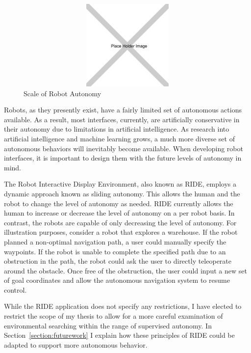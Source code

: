 \begin{figure}[ht]
\begin{center}
\includegraphics[width=5in,height=1.75in]{images/placeholder.png}
\caption{Scale of Robot Autonomy\label{fig:autonomy}}
\end{center}
\end{figure}

Robots, as they presently exist, have a fairly limited set of autonomous actions available. As a result, most interfaces, currently, are artificially conservative in their autonomy due to limitations in artificial intelligence. As research into artificial intelligence and machine learning grows, a much more diverse set of autonomous behaviors will inevitably become available. When developing robot interfaces, it is important to design them with the future levels of autonomy in mind. 

The Robot Interactive Display Environment, also known as RIDE, employs a dynamic approach known as sliding autonomy. This allows the human and the robot to change the level of autonomy as needed. RIDE currently allows the human to increase or decrease the level of autonomy on a per robot basis. In contrast, the robots are capable of only decreasing the level of autonomy. For illustration purposes, consider a robot that explores a warehouse. If the robot planned a non-optimal navigation path, a user could manually specify the waypoints. If the robot is unable to complete the specified path due to an obstruction in the path, the robot could ask the user to directly teleoperate around the obstacle. Once free of the obstruction, the user could input a new set of goal coordinates and allow the autonomous navigation system to resume control.


While the RIDE application does not specify any restrictions, I have elected to restrict the scope of my thesis to allow for a more careful examination of environmental searching within the range of supervised autonomy. In Section~\ref{section:futurework} I explain how these principles of RIDE could be adapted to support more autonomous behavior.

